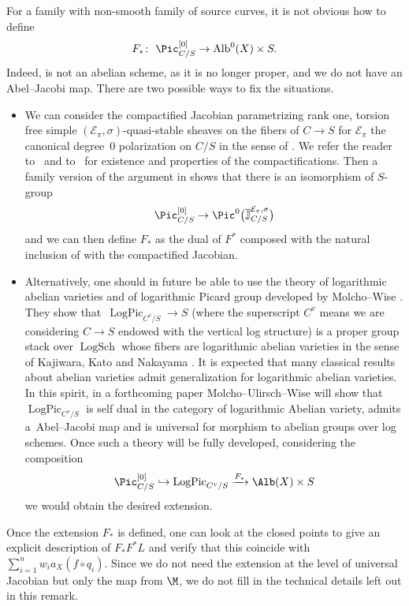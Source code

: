 \begin{remarkk}
For a family  with non-smooth family of source curves, it is not obvious how to define
\[F_*\colon\ \Pic^{[0]}_{C\slash S}\to\operatorname{Alb}^0(X)\times S.\]
Indeed,  is not an abelian scheme, as it is no longer proper, and we do not have an Abel--Jacobi map. There are two possible ways to fix the situations.
\begin{itemize}\itemsep=0pt
\item We can consider the compactified Jacobian  parametrizing rank one, torsion free simple $(\mathcal E_{\pi},\sigma)$-quasi-stable sheaves on the fibers of $C\to S$ for $\mathcal E_{\pi}$ the canonical degree~$0$ polarization on $C\slash S$ in the sense of \cite[Section~2.1]{melo2015compactifications}. We refer the reader to~\cite{melo2015compactifications} and to~\cite{MeloRapagnettaViviani} for existence and properties of the compactifications.
Then a family version of the argument in \cite[Section~5]{MeloRapagnettaViviani} shows that there is an isomorphism of $S$-group
\[
\Pic^{[0]}_{C\slash S}\to \Pic^0\bigl(\overline{\mathbb J}_{C/S}^{\mathcal E_{\pi},\sigma}\bigr)
\]
and we can then define $F_*$ as the dual of $F^*$ composed with the natural inclusion of  with the compactified Jacobian.

\item Alternatively, one should in future be able to use the theory of logarithmic abelian varieties and of logarithmic Picard group developed by Molcho--Wise \cite{molchowiselog}. They show that~$\operatorname{LogPic}_{C^v\slash S}\to S$ (where the superscript $C^v$ means we are considering $C\to S$ endowed with the vertical log structure)
is a proper group stack over $\operatorname{LogSch}$
whose fibers are logarithmic abelian varieties in the sense of Kajiwara, Kato and Nakayama \cite{kajiwara2008logarithmic}.
It is expected that many classical results about abelian varieties admit generalization for logarithmic abelian varieties. In this spirit, in a forthcoming paper \cite{delignepair} Molcho--Ulirsch--Wise will show that $\operatorname{LogPic}_{C^v\slash S}$ is self dual in the category of logarithmic Abelian variety, admits a~Abel--Jacobi map and is universal for morphism to abelian groups over log schemes.
Once such a theory will be fully developed, considering the composition
 \[
 \Pic^{[0]}_{C\slash S}\hookrightarrow \operatorname{LogPic}_{C^v\slash S}\xrightarrow{F_*}\Alb(X)\times S
 \]
we would obtain the desired extension.
\end{itemize}

Once the extension $F_*$ is defined, one can look at the closed points to give an explicit description of $F_*F^*L$ and verify that this coincide with $\sum_{i=1}^n w_i a_X(f\circ q_i)$.
Since we do not need the extension at the level of universal Jacobian but only the map from $\M$, we do not fill in the technical details left out in this remark.
\end{remarkk}



